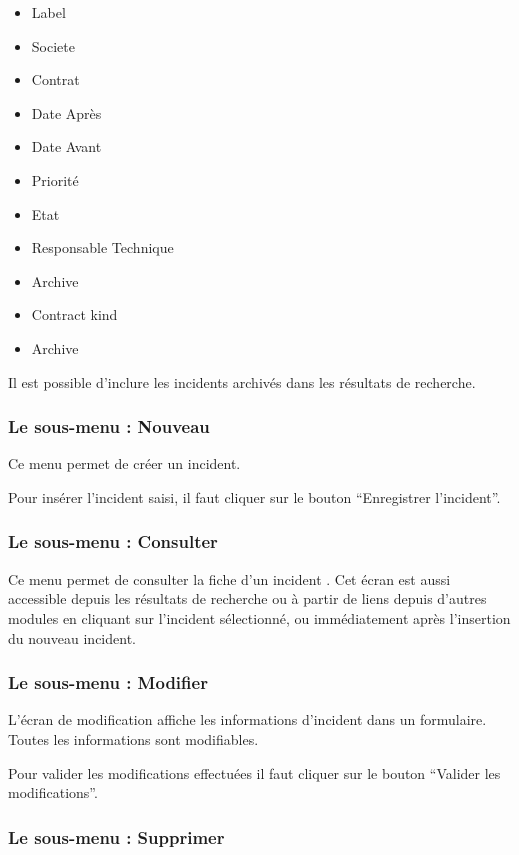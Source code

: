 \begin{itemize}
\item Label
\item Societe
\item Contrat
\item Date Après
\item Date Avant
\item Priorité
\item Etat
\item Responsable Technique
\item Archive
\item Contract kind
\item Archive
\end{itemize}

Il est possible d'inclure les incidents archivés dans les résultats de recherche.


\subsubsection{Le sous-menu : Nouveau}

Ce menu permet de créer un incident.

Pour insérer l'incident saisi, il faut cliquer sur le bouton ``Enregistrer l'incident''.


\subsubsection{Le sous-menu : Consulter}

Ce menu permet de consulter la fiche d'un incident .
Cet écran est aussi accessible depuis les résultats de recherche ou à partir de liens depuis d'autres modules en cliquant sur l'incident sélectionné, ou immédiatement après l'insertion du nouveau incident.


\subsubsection{Le sous-menu : Modifier}

L'écran de modification affiche les informations d'incident dans un formulaire.
Toutes les informations sont modifiables.

Pour valider les modifications effectuées il faut cliquer sur le bouton ``Valider les modifications''.


\subsubsection{Le sous-menu : Supprimer}

